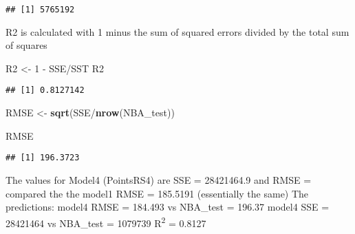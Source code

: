 \documentclass[]{article}
\newenvironment{Shaded}{\begin{snugshade}}{\end{snugshade}}
\newcommand{\KeywordTok}[1]{\textcolor[rgb]{0.13,0.29,0.53}{\textbf{{#1}}}}
\newcommand{\DecValTok}[1]{\textcolor[rgb]{0.00,0.00,0.81}{{#1}}}
\newcommand{\StringTok}[1]{\textcolor[rgb]{0.31,0.60,0.02}{{#1}}}
\newcommand{\NormalTok}[1]{{#1}}
\begin{document}
\begin{Shaded}
\end{Shaded}

\begin{verbatim}
## [1] 5765192
\end{verbatim}

R2 is calculated with 1 minus the sum of squared errors divided by the
total sum of squares

\begin{Shaded}
\begin{Highlighting}[]
\NormalTok{R2 <-}\StringTok{ }\DecValTok{1} \NormalTok{-}\StringTok{ }\NormalTok{SSE/SST}
\NormalTok{R2}
\end{Highlighting}
\end{Shaded}

\begin{verbatim}
## [1] 0.8127142
\end{verbatim}

\begin{Shaded}
\begin{Highlighting}[]
\NormalTok{RMSE <-}\StringTok{ }\KeywordTok{sqrt}\NormalTok{(SSE/}\KeywordTok{nrow}\NormalTok{(NBA_test))}

\NormalTok{RMSE}
\end{Highlighting}
\end{Shaded}

\begin{verbatim}
## [1] 196.3723
\end{verbatim}

The values for Model4 (PointsRS4) are SSE = 28421464.9 and RMSE =
compared the the model1 RMSE = 185.5191 (essentially the same) The
predictions: model4 RMSE = 184.493 vs NBA\_test = 196.37 model4 SSE =
28421464 vs NBA\_test = 1079739 R\textsuperscript{2} = 0.8127
\end{document}
